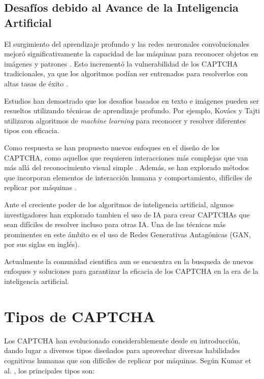 \documentclass[conference]{IEEEtran}
\begin{document}
\subsection{Desafíos debido al Avance de la Inteligencia Artificial}

El surgimiento del aprendizaje profundo y las redes neuronales convolucionales mejoró significativamente la capacidad de las máquinas para reconocer objetos en imágenes y patrones \cite{Krizhevsky2012}. Esto incrementó la vulnerabilidad de los CAPTCHA tradicionales, ya que los algoritmos podían ser entrenados para resolverlos con altas tasas de éxito \cite{Goodfellow2014}.

Estudios han demostrado que los desafios basados en texto e imágenes pueden ser resueltos utilizando técnicas de aprendizaje profundo. Por ejemplo, Kovács y Tajti \cite{Kovacs2023} utilizaron algoritmos de \textit{machine learning} para reconocer y resolver diferentes tipos con eficacia.

Como respuesta se han propuesto nuevos enfoques en el diseño de los CAPTCHA, como aquellos que requieren interacciones más complejas que van más allá del reconocimiento visual simple \cite{HernandezCastro2010}. Además, se han explorado métodos que incorporan elementos de interacción humana y comportamiento, difíciles de replicar por máquinas \cite{Zhu2010}.

Ante el creciente poder de los algoritmos de inteligencia artificial, algunos investigadores han explorado tambien el uso de IA para crear CAPTCHAs que sean difíciles de resolver incluso para otras IA. Una de las técnicas más prominentes en este ámbito es el uso de Redes Generativas Antagónicas (GAN, por sus siglas en inglés).

Actualmente la comunidad cientifica aun se encuentra en la busqueda de nuevos enfoques y soluciones para garantizar la eficacia de los CAPTCHA en la era de la inteligencia artificial. \cite{Shirali2018}

\bigskip

\section{Tipos de CAPTCHA}

Los CAPTCHA han evolucionado considerablemente desde su introducción, dando lugar a diversos tipos diseñados para aprovechar diversas habilidades cognitivas humanas que son difíciles de replicar por máquinas. Según Kumar et al. \cite{Kumar2022}, los principales tipos son:
\end{document}
